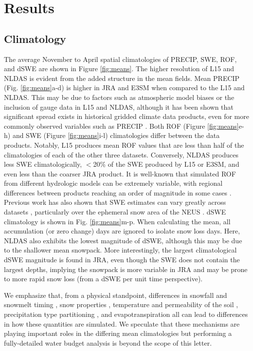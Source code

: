 \documentclass[draft]{agujournal2019}
\begin{document}
\section{Results}

\subsection{Climatology}

The average November to April spatial climatologies of PRECIP, SWE, ROF, and dSWE are shown in Figure \ref{fig:means}. 
The higher resolution of L15 and NLDAS is evident from the added structure in the mean fields. 
Mean PRECIP (Fig. \ref{fig:means}a-d) is higher in JRA and E3SM when compared to the L15 and NLDAS. 
This may be due to factors such as atmospheric model biases or the inclusion of gauge data in L15 and NLDAS, although it has been shown that significant spread exists in historical gridded climate data products, even for more commonly observed variables such as PRECIP \citep{gutmann2012comparison,livneh2014filling,henn2018an}.
Both ROF (Figure \ref{fig:means}e-h) and SWE (Figure \ref{fig:means}i-l) climatologies differ between the data products. 
Notably, L15 produces mean ROF values that are less than half of the climatologies of each of the other three datasets. 
Conversely, NLDAS produces less SWE climatologically, $<$20\% of the SWE produced by L15 or E3SM, and even less than the coarser JRA product. 
It is well-known that simulated ROF from different hydrologic models can be extremely variable, with regional differences between products reaching an order of magnitude in some cases \citep{gudmundsson2012comparing,sood2015global,beck2017global}. 
Previous work has also shown that SWE estimates can vary greatly across datasets \citep{lundquist2015high,Rhoades2018a}, particularly over the ephemeral snow area of the NEUS \citep{mccrary2017evaluation,mccrary2022projections}. 
dSWE climatology is shown in Fig. \ref{fig:means}m-p.
When calculating the mean, all accumulation (or zero change) days are ignored to isolate snow loss days. 
Here, NLDAS also exhibits the lowest magnitude of dSWE, although this may be due to the shallower mean snowpack. 
More interestingly, the largest climatological dSWE magnitude is found in JRA, even though the SWE does not contain the largest depths, implying the snowpack is more variable in JRA and may be prone to more rapid snow loss (from a dSWE per unit time perspective).

We emphasize that, from a physical standpoint, differences in snowfall and snowmelt timing \citep{rauscher2008future,mccabe2005trends}, snow properties \citep{brown2006evaluation}, temperature and permeability of the soil \citep{niu2006effects}, precipitation type partitioning \citep{knowles2006trends}, and evapotranspiration \citep{zheng2019on} all can lead to differences in how these quantities are simulated. We speculate that these mechanisms are playing important roles in the differing mean climatologies but performing a fully-detailed water budget analysis is beyond the scope of this letter.
\end{document}
